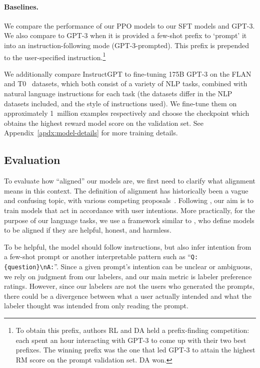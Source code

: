 \paragraph{Baselines.} We compare the performance of our PPO models to our SFT models and GPT-3. We also compare to GPT-3 when it is provided a few-shot prefix to ‘prompt' it into an instruction-following mode (GPT-3-prompted). This prefix is prepended to the user-specified instruction.\footnote{To obtain this prefix, authors RL and DA held a prefix-finding competition: each spent an hour interacting with GPT-3 to come up with their two best prefixes. The winning prefix was the one that led GPT-3 to attain the highest RM score on the prompt validation set. DA won.}

We additionally compare InstructGPT to fine-tuning 175B GPT-3 on the FLAN~\citep{wei2021finetuned} and T0~\citep{sanh2021multitask} datasets, which both consist of a variety of NLP tasks, combined with natural language instructions for each task (the datasets differ in the NLP datasets included, and the style of instructions used). We fine-tune them on approximately 1~million examples respectively and choose the checkpoint which obtains the highest reward model score on the validation set. See Appendix~\ref{apdx:model-details} for more training details.

\subsection{Evaluation}
\label{sec:evaluation}

To evaluate how ``aligned'' our models are, we first need to clarify what alignment means in this context. The definition of alignment has historically been a vague and confusing topic, with various competing proposals~\citep{chen2021evaluating,leike2018scalable,gabriel2020artificial}. Following \citet{leike2018scalable}, our aim is to train models that act in accordance with user intentions. More practically, for the purpose of our language tasks, we use a framework similar to \citet{askell2021general}, who define models to be aligned if they are helpful, honest, and harmless.

To be helpful, the model should follow instructions, but also infer intention from a few-shot prompt or another interpretable pattern such as ``\texttt{Q: \{question\}\textbackslash nA:}''. Since a given prompt's intention can be unclear or ambiguous, we rely on judgment from our labelers, and our main metric is labeler preference ratings. However, since our labelers are not the users who generated the prompts, there could be a divergence between what a user actually intended and what the labeler thought was intended from only reading the prompt.

